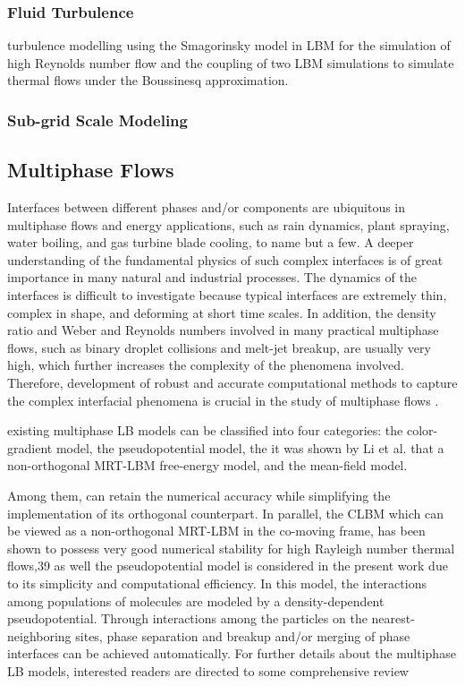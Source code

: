 \subsubsection{Fluid Turbulence}

turbulence modelling using the Smagorinsky model in LBM for the simulation of high Reynolds number flow and the coupling of two LBM simulations to simulate thermal flows under the Boussinesq approximation.

\subsubsection{Sub-grid Scale Modeling}

\subsection{Multiphase Flows}

Interfaces between different phases and/or components are ubiquitous in multiphase flows and energy applications, such as rain dynamics, plant spraying, water boiling, and gas turbine blade cooling, to name but a few. A deeper understanding of the fundamental physics of such complex interfaces is of great importance in many natural and industrial processes. The dynamics of the interfaces is difficult to investigate because typical interfaces are extremely thin, complex in shape, and deforming at short time scales. In addition, the density ratio and Weber and Reynolds numbers involved in many practical multiphase flows, such as binary droplet collisions and melt-jet breakup, are usually very high, which further increases the complexity of the phenomena involved. Therefore, development of robust and accurate computational methods to capture the complex interfacial phenomena is crucial in the study of multiphase flows \cite{feiModelingRealisticMultiphase2019}.

existing multiphase LB models can be classified into four categories: the color-gradient model, the pseudopotential model, the it was shown by Li et al. that a non-orthogonal MRT-LBM free-energy model, and the mean-field model.
%

Among them, can retain the numerical accuracy while simplifying the implementation of its orthogonal counterpart. In parallel, the CLBM which can be viewed as a non-orthogonal MRT-LBM in the co-moving frame, has been shown to possess very good numerical stability for high Rayleigh number thermal flows,39 as well the pseudopotential model is considered in the present work due to its simplicity and computational efficiency. In this model, the interactions among populations of molecules are modeled by a density-dependent pseudopotential. Through interactions among the particles on the nearest-neighboring sites, phase separation and breakup and/or merging of phase interfaces can be achieved automatically. For further details about the multiphase LB models, interested readers are directed to some comprehensive review

